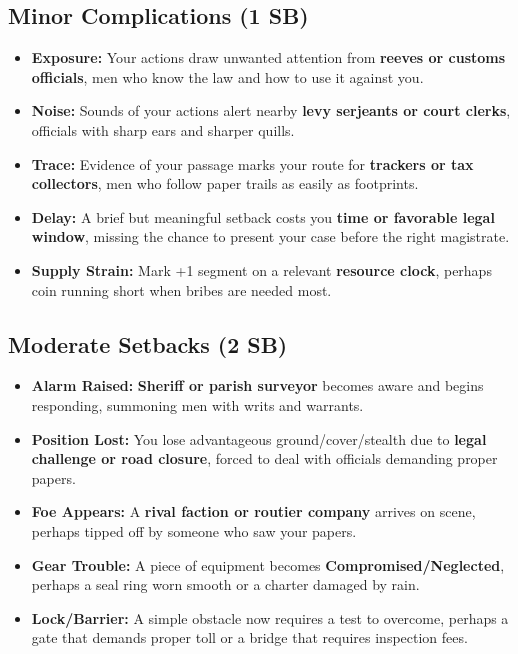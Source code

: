 \subsection*{Minor Complications (1 SB)}
\begin{itemize}
\item \textbf{Exposure:} Your actions draw unwanted attention from \textbf{reeves or customs officials}, men who know the law and how to use it against you.
\item \textbf{Noise:} Sounds of your actions alert nearby \textbf{levy serjeants or court clerks}, officials with sharp ears and sharper quills.
\item \textbf{Trace:} Evidence of your passage marks your route for \textbf{trackers or tax collectors}, men who follow paper trails as easily as footprints.
\item \textbf{Delay:} A brief but meaningful setback costs you \textbf{time or favorable legal window}, missing the chance to present your case before the right magistrate.
\item \textbf{Supply Strain:} Mark +1 segment on a relevant \textbf{resource clock}, perhaps coin running short when bribes are needed most.
\end{itemize}

\subsection*{Moderate Setbacks (2 SB)}
\begin{itemize}
\item \textbf{Alarm Raised:} \textbf{Sheriff or parish surveyor} becomes aware and begins responding, summoning men with writs and warrants.
\item \textbf{Position Lost:} You lose advantageous ground/cover/stealth due to \textbf{legal challenge or road closure}, forced to deal with officials demanding proper papers.
\item \textbf{Foe Appears:} A \textbf{rival faction or routier company} arrives on scene, perhaps tipped off by someone who saw your papers.
\item \textbf{Gear Trouble:} A piece of equipment becomes \textbf{Compromised/Neglected}, perhaps a seal ring worn smooth or a charter damaged by rain.
\item \textbf{Lock/Barrier:} A simple obstacle now requires a test to overcome, perhaps a gate that demands proper toll or a bridge that requires inspection fees.
\end{itemize}


